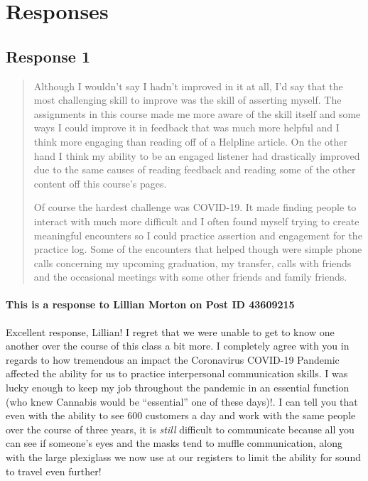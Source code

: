 
\section{Responses}
  \subsection{Response 1}
    \begin{quotation}
      Although I wouldn’t say I hadn’t improved in it at all, I’d say that the
        most challenging skill to improve was the skill of asserting myself.
        The assignments in this course made me more aware of the skill itself
        and some ways I could improve it in feedback that was much more helpful
        and I think more engaging than reading off of a Helpline article. On the
        other hand I think my ability to be an engaged listener had drastically
        improved due to the same causes of reading feedback and reading some of
        the other content off this course’s pages.

      Of course the hardest challenge was COVID-19. It made finding people to
        interact with much more difficult and I often found myself trying to
        create meaningful encounters so I could practice assertion and
        engagement for the practice log. Some of the encounters that helped
        though were simple phone calls concerning my upcoming graduation, my
        transfer, calls with friends and the occasional meetings with some other
        friends and family friends.
    \end{quotation}

    \paragraph{This is a response to Lillian Morton on Post ID 43609215}
      Excellent response, Lillian! I regret that we were unable to get to know
        one another over the course of this class a bit more. I completely
        agree with you in regards to how tremendous an impact the Coronavirus
        COVID-19 Pandemic affected the ability for us to practice interpersonal
        communication skills. I was lucky enough to keep my job throughout the
        pandemic in an essential function (who knew Cannabis would be
        ``essential'' one of these days)!. I can tell you that even with the
        ability to see 600 customers a day and work with the same people over
        the course of three years, it is \textit{still} difficult to communicate
        because all you can see if someone's eyes and the masks tend to muffle
        communication, along with the large plexiglass we now use at our
        registers to limit the ability for sound to travel even further!
